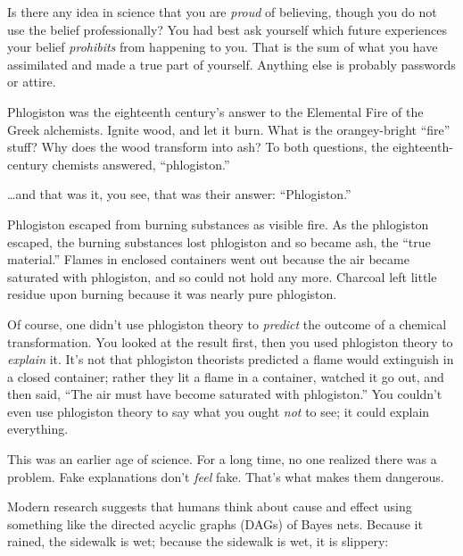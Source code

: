 {
 Is there any idea in science that you are \textit{proud} of
believing, though you do not use the belief professionally? You had
best ask yourself which future experiences your belief
\textit{prohibits} from happening to you. That is the sum of what you
have assimilated and made a true part of yourself. Anything else is
probably passwords or attire.}

\myendsectiontext

\label{fake_causality}

{
 Phlogiston was the eighteenth century's answer to
the Elemental Fire of the Greek alchemists. Ignite wood, and let it
burn. What is the orangey-bright
``fire'' stuff? Why does the wood
transform into ash? To both questions, the eighteenth-century chemists
answered, ``phlogiston.'' }

{
 \ldots and that was it, you see, that was their answer:
``Phlogiston.''}

{
 Phlogiston escaped from burning substances as visible fire. As the
phlogiston escaped, the burning substances lost phlogiston and so
became ash, the ``true material.''
Flames in enclosed containers went out because the air became saturated
with phlogiston, and so could not hold any more. Charcoal left little
residue upon burning because it was nearly pure phlogiston.}

{
 Of course, one didn't use phlogiston theory to
\textit{predict} the outcome of a chemical transformation. You looked
at the result first, then you used phlogiston theory to
\textit{explain} it. It's not that phlogiston theorists
predicted a flame would extinguish in a closed container; rather they
lit a flame in a container, watched it go out, and then said,
``The air must have become saturated with
phlogiston.'' You couldn't even use
phlogiston theory to say what you ought \textit{not} to see; it could
explain everything.}

{
 This was an earlier age of science. For a long time, no one
realized there was a problem. Fake explanations don't
\textit{feel} fake. That's what makes them dangerous.}

{
 Modern research suggests that humans think about cause and effect
using something like the directed acyclic graphs (DAGs) of Bayes nets.
Because it rained, the sidewalk is wet; because the sidewalk is wet, it
is slippery:}

{
 ~}


{
 ~}

